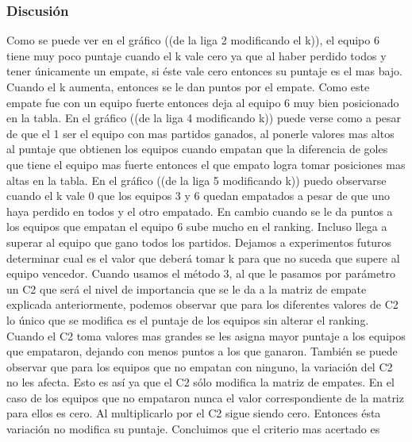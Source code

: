             \subsubsection*{Discusión}
            Como se puede ver en el gráfico ((de la liga 2 modificando el k)), el equipo 6 tiene muy poco puntaje cuando el k vale cero ya que al haber perdido todos y tener únicamente un empate, si éste vale cero entonces su puntaje es el mas bajo. Cuando el k aumenta, entonces se le dan puntos por el empate. Como este empate fue con un equipo fuerte entonces deja al equipo 6 muy bien posicionado en la tabla. 
            En el gráfico ((de la liga 4 modificando k)) puede verse como a pesar de que el 1 ser el equipo con mas partidos ganados, al ponerle valores mas altos al puntaje que obtienen los equipos cuando empatan que la diferencia de goles que tiene el equipo mas fuerte entonces el que empato logra tomar posiciones mas altas en la tabla. 
            En el gráfico ((de la liga 5 modificando k)) puedo observarse cuando el k vale 0 que los equipos 3 y 6 quedan empatados a pesar de que uno haya perdido en todos y el otro empatado. En cambio cuando se le da puntos a los equipos que empatan el equipo 6 sube mucho en el ranking. Incluso llega a superar al equipo que gano todos los partidos. Dejamos a experimentos futuros determinar cual es el valor que deberá tomar k para que no suceda que supere al equipo vencedor. 
            Cuando usamos el método 3, al que le pasamos por parámetro un C2 que será el nivel de importancia que se le da a la matriz de empate explicada anteriormente, podemos observar que para los diferentes valores de C2 lo único que se modifica es el puntaje de los equipos sin alterar el ranking. Cuando el C2 toma valores mas grandes se les asigna mayor puntaje a los equipos que empataron, dejando con menos puntos a los que ganaron. 
            También se puede observar que para los equipos que no empatan con ninguno, la variación del C2 no les afecta. Esto es así ya que el C2 sólo modifica la matriz de empates. En el caso de los equipos que no empataron nunca el valor correspondiente de la matriz para ellos es cero. Al multiplicarlo por el C2 sigue siendo cero. Entonces ésta variación no modifica su puntaje.
            Concluimos que el criterio mas acertado es